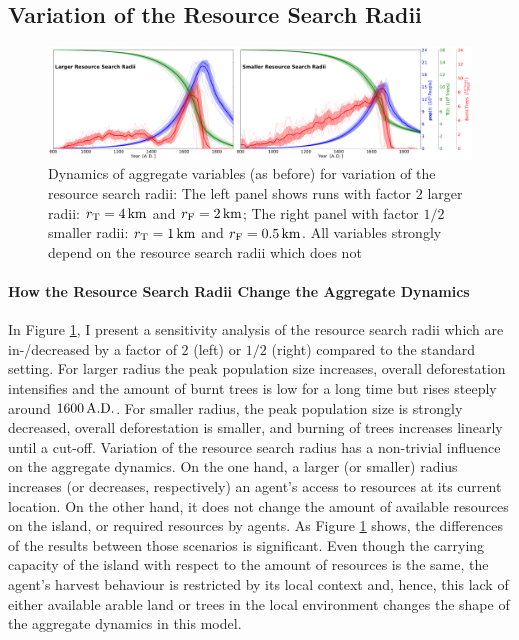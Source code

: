 \subsection{Variation of the Resource Search Radii}
\begin{figure}
	\centering
	\includegraphics[width=1.3\linewidth, center]{images/Results/EnsembleStatistics_largersmallerRad}
	\caption{Dynamics of aggregate variables (as before) for variation of the resource search radii: The left panel shows runs with factor $2$ larger radii: $r_{\rm T}=4\, {\rm km}$ and $r_{\rm F}=2\, {\rm km}$; The right panel with factor $1/2$ smaller radii: $r_{\rm T}=1\, {\rm km}$ and $r_{\rm F}=0.5\, {\rm km}$. All variables strongly depend on the resource search radii which does not}
	\label{fig:ensemblestatisticslargersmallerrad}
\end{figure}

\paragraph{How the Resource Search Radii Change the Aggregate Dynamics}
In Figure \ref{fig:ensemblestatisticslargersmallerrad}, I present a sensitivity analysis of the resource search radii which are in-/decreased by a factor of $2$ (left) or  $1/2$ (right) compared to the standard setting. 
For larger radius the peak population size increases, overall deforestation intensifies and the amount of burnt trees is low for a long time but rises steeply around $1600\, {\rm A.D.}$.
For smaller radius, the peak population size is strongly decreased, overall deforestation is smaller, and burning of trees increases linearly until a cut-off.
Variation of the resource search radius has a non-trivial influence on the aggregate dynamics.
On the one hand, a larger (or smaller) radius increases (or decreases, respectively) an agent's access to resources at its current location. 
On the other hand, it does not change the amount of available resources on the island, or required resources by agents.
As Figure \ref{fig:ensemblestatisticslargersmallerrad} shows, the differences of the results between those scenarios is significant. 
Even though the carrying capacity of the island with respect to the amount of resources is the same, the agent's harvest behaviour is restricted by its local context and, hence, this lack of either available arable land or trees in the local environment changes the shape of the aggregate dynamics in this model.


